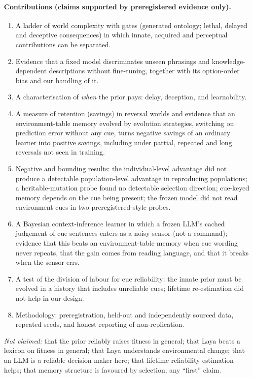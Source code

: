 \documentclass[11pt]{article}
\begin{document}
\paragraph{Contributions (claims supported by preregistered evidence only).}
\begin{enumerate}
  \item A ladder of world complexity with gates (generated ontology; lethal, delayed and deceptive consequences) in which innate, acquired and perceptual contributions can be separated.
  \item Evidence that a fixed model discriminates unseen phrasings and knowledge-dependent descriptions without fine-tuning, together with its option-order bias and our handling of it.
  \item A characterisation of \emph{when} the prior pays: delay, deception, and learnability.
  \item A measure of retention (savings) in reversal worlds and evidence that an environment-table memory evolved by evolution strategies, switching on prediction error without any cue, turns negative savings of an ordinary learner into positive savings, including under partial, repeated and long reversals not seen in training.
  \item Negative and bounding results: the individual-level advantage did not produce a detectable population-level advantage in reproducing populations; a heritable-mutation probe found no detectable selection direction; cue-keyed memory depends on the cue being present; the frozen model did not read environment cues in two preregistered-style probes.
  \item A Bayesian context-inference learner in which a frozen LLM's cached judgement of cue sentences enters as a noisy sensor (not a command); evidence that this beats an environment-table memory when cue wording never repeats, that the gain comes from reading language, and that it breaks when the sensor errs.
  \item A test of the division of labour for cue reliability: the innate prior must be evolved in a history that includes unreliable cues; lifetime re-estimation did not help in our design.
  \item Methodology: preregistration, held-out and independently sourced data, repeated seeds, and honest reporting of non-replication.
\end{enumerate}
\emph{Not claimed:} that the prior reliably raises fitness in general; that Laya beats a lexicon on fitness in general; that Laya understands environmental change; that an LLM is a reliable decision-maker here; that lifetime reliability estimation helps; that memory structure is favoured by selection; any ``first'' claim.
\end{document}
